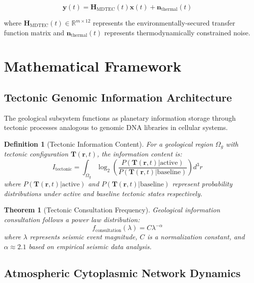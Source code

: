 \documentclass[12pt,a4paper]{article}
\newtheorem{theorem}{Theorem}
\newtheorem{definition}{Definition}
\begin{document}
\begin{equation}
\mathbf{y}(t) = \mathbf{H}_{\text{MDTEC}}(t) \mathbf{x}(t) + \mathbf{n}_{\text{thermal}}(t)
\end{equation}

where $\mathbf{H}_{\text{MDTEC}}(t) \in \mathbb{R}^{m \times 12}$ represents the environmentally-secured transfer function matrix and $\mathbf{n}_{\text{thermal}}(t)$ represents thermodynamically constrained noise.

\section{Mathematical Framework}

\subsection{Tectonic Genomic Information Architecture}

The geological subsystem functions as planetary information storage through tectonic processes analogous to genomic DNA libraries in cellular systems.

\begin{definition}[Tectonic Information Content]
For a geological region $\Omega_g$ with tectonic configuration $\mathbf{T}(\mathbf{r}, t)$, the information content is:
\begin{equation}
I_{\text{tectonic}} = \int_{\Omega_g} \log_2\left(\frac{P(\mathbf{T}(\mathbf{r}, t)|\text{active})}{P(\mathbf{T}(\mathbf{r}, t)|\text{baseline})}\right) d^3r
\end{equation}
where $P(\mathbf{T}(\mathbf{r}, t)|\text{active})$ and $P(\mathbf{T}(\mathbf{r}, t)|\text{baseline})$ represent probability distributions under active and baseline tectonic states respectively.
\end{definition}

\begin{theorem}[Tectonic Consultation Frequency]
Geological information consultation follows a power law distribution:
\begin{equation}
f_{\text{consultation}}(\lambda) = C \lambda^{-\alpha}
\end{equation}
where $\lambda$ represents seismic event magnitude, $C$ is a normalization constant, and $\alpha \approx 2.1$ based on empirical seismic data analysis.
\end{theorem}

\subsection{Atmospheric Cytoplasmic Network Dynamics}
\end{document}
